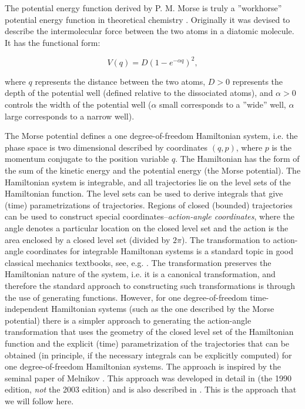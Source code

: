 \documentclass{ws-ijbc}
\begin{document}
The potential energy function derived by P. M. Morse is truly a ''workhorse''  potential energy function in theoretical chemistry \cite{morse1929diatomic}.  Originally it was devised to describe the intermolecular force between the two atoms in a diatomic molecule. It has the functional form:

\begin{equation}
V(q) =  D \left( 1-e^{-\alpha q} \right)^2,
\label{eq:mpot}
\end{equation}

\noindent
where $q$ represents the distance between the two atoms, $D >0$ represents the depth of the potential well (defined relative to the dissociated atoms), and $\alpha >0$ controls the width of the potential well ($\alpha$ small corresponds to a ''wide'' well, $\alpha$ large corresponds to a narrow well). 

The Morse potential defines a one degree-of-freedom Hamiltonian system, i.e. the phase space is two dimensional described by coordinates $(q, p)$, where $p$ is the momentum conjugate to the position variable $q$.  The Hamiltonian has the form of the sum of the  kinetic energy and the potential energy (the Morse potential).  The Hamiltonian system is integrable, and all trajectories lie on the level sets of the Hamiltonian function.  The level sets can be used to derive integrals that give (time) parametrizations of trajectories. Regions of closed (bounded) trajectories can be used to construct special coordinates--{\em action-angle coordinates}, where the angle denotes a particular location on the closed level set and the action is the area enclosed by a closed level set (divided by $2 \pi$). The transformation to action-angle coordinates for integrable Hamiltonan systems is a standard topic in good classical mechanics textbooks, see, e.g. \cite{landau1960mechanics, arnold2013mathematical}. The transformation preserves the Hamiltonian nature of the system, i.e. it is a canonical transformation, and therefore the standard approach to constructing such transformations is through the use of generating functions. However, for one degree-of-freedom time-independent Hamiltonian systems (such as the one described by the Morse potential)  there is a simpler approach to generating the action-angle transformation that uses the geometry of the closed level set of the Hamiltonian function and the explicit (time) parametrization of the trajectories that can  be obtained (in principle, if the necessary integrals can be explicitly computed)  for one degree-of-freedom Hamiltonian systems. The approach is inspired by the seminal paper of Melnikov \cite{melnikov1963vk}. This approach was developed in detail in \cite{wiggins1990introduction} (the 1990 edition, {\em not} the 2003 edition)
 and is also described in \cite{mezic1994integrability}. This is the approach that we will follow here.
 
\end{document}
